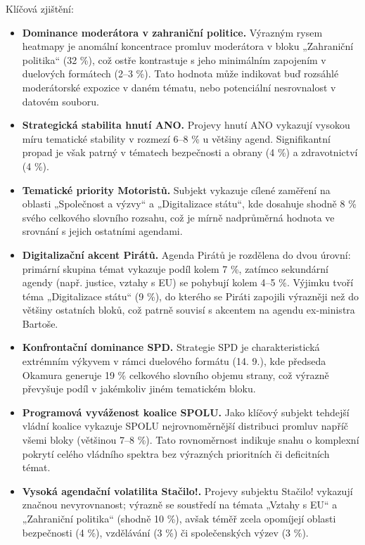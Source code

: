 \documentclass[12pt, a4paper]{article}
\begin{document}
Klíčová zjištění:

\begin{itemize}
  \item \textbf{Dominance moderátora v zahraniční politice.} Výrazným rysem heatmapy je anomální koncentrace promluv moderátora v bloku „Zahraniční politika“ (32 \%), což ostře kontrastuje s jeho minimálním zapojením v duelových formátech (2--3 \%). Tato hodnota může indikovat buď rozsáhlé moderátorské expozice v daném tématu, nebo potenciální nesrovnalost v datovém souboru.

  \item \textbf{Strategická stabilita hnutí ANO.} Projevy hnutí ANO vykazují vysokou míru tematické stability v rozmezí 6--8 \% u většiny agend. Signifikantní propad je však patrný v tématech bezpečnosti a obrany (4 \%) a zdravotnictví (4 \%).

  \item \textbf{Tematické priority Motoristů.} Subjekt vykazuje cílené zaměření na oblasti „Společnost a výzvy“ a „Digitalizace státu“, kde dosahuje shodně 8 \% svého celkového slovního rozsahu, což je mírně nadprůměrná hodnota ve srovnání s jejich ostatními agendami.

  \item \textbf{Digitalizační akcent Pirátů.} Agenda Pirátů je rozdělena do dvou úrovní: primární skupina témat vykazuje podíl kolem 7 \%, zatímco sekundární agendy (např. justice, vztahy s EU) se pohybují kolem 4--5 \%. Výjimku tvoří téma „Digitalizace státu“ (9 \%), do kterého se Piráti zapojili výrazněji než do většiny ostatních bloků, což patrně souvisí s akcentem na agendu ex-ministra Bartoše.

  \item \textbf{Konfrontační dominance SPD.} Strategie SPD je charakteristická extrémním výkyvem v rámci duelového formátu (14. 9.), kde předseda Okamura generuje 19 \% celkového slovního objemu strany, což výrazně převyšuje podíl v jakémkoliv jiném tematickém bloku.

  \item \textbf{Programová vyváženost koalice SPOLU.} Jako klíčový subjekt tehdejší vládní koalice vykazuje SPOLU nejrovnoměrnější distribuci promluv napříč všemi bloky (většinou 7--8 \%). Tato rovnoměrnost indikuje snahu o komplexní pokrytí celého vládního spektra bez výrazných prioritních či deficitních témat.

  \item \textbf{Vysoká agendační volatilita Stačilo!.} Projevy subjektu Stačilo! vykazují značnou nevyrovnanost; výrazně se soustředí na témata „Vztahy s EU“ a „Zahraniční politika“ (shodně 10 \%), avšak téměř zcela opomíjejí oblasti bezpečnosti (4 \%), vzdělávání (3 \%) či společenských výzev (3 \%).
\end{itemize}
\end{document}

